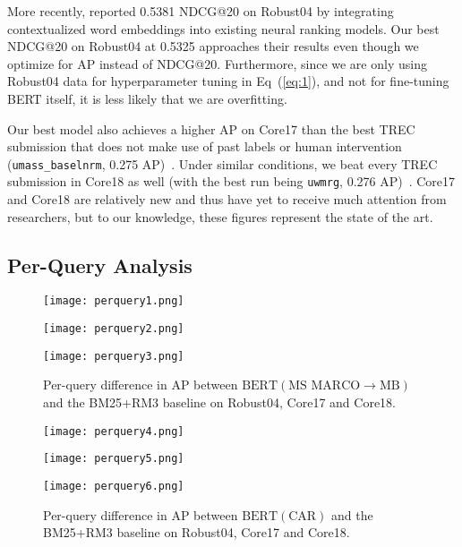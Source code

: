 More recently, \cite{MacAvaney_etal_SIGIR2019} reported 0.5381 NDCG@20 on Robust04 by integrating contextualized word embeddings into existing neural ranking models.
Our best NDCG@20 on \mbox{Robust04} at 0.5325 approaches their results even though we optimize for AP instead of NDCG@20.
Furthermore, since we are only using Robust04 data for hyperparameter tuning in Eq~(\ref{eq:1}), and not for fine-tuning BERT itself, it is less likely that we are overfitting.

Our best model also achieves a higher AP on Core17 than the best TREC submission that does not make use of past labels or human intervention (\texttt{umass\_baselnrm}, 0.275 AP)~\cite{allan2017trec}.
Under similar conditions, we beat every TREC submission in Core18 as well (with the best run being \texttt{uwmrg}, 0.276 AP)~\cite{core2018trec}.
Core17 and Core18 are relatively new and thus have yet to receive much attention from researchers, but to our knowledge, these figures represent the state of the art.

\subsection{Per-Query Analysis}

\begin{figure}[t!]
	\centering
    \begin{minipage}{0.3\textwidth}
        \centering
        \texttt{[image: perquery1.png]}
    \end{minipage}\hfill
    \begin{minipage}{0.3\textwidth}
        \centering
        \texttt{[image: perquery2.png]}
    \end{minipage}\hfill
    \begin{minipage}{0.3\textwidth}
        \centering
        \texttt{[image: perquery3.png]}
    \end{minipage}
\caption{Per-query difference in AP between $ \textrm{BERT}(\textrm{MS MARCO}\rightarrow\textrm{MB}) $ and the BM25+RM3 baseline on Robust04, Core17 and Core18.}
\label{fig:perquery-msmarcomb}
\end{figure}

\begin{figure}[b!]
	\centering
    \begin{minipage}{0.3\textwidth}
        \centering
        \texttt{[image: perquery4.png]} %
    \end{minipage}\hfill
    \begin{minipage}{0.3\textwidth}
        \centering
        \texttt{[image: perquery5.png]} %
    \end{minipage}\hfill
    \begin{minipage}{0.3\textwidth}
        \centering
        \texttt{[image: perquery6.png]} %
    \end{minipage}
\caption{Per-query difference in AP between $ \textrm{BERT}(\textrm{CAR}) $ and the BM25+RM3 baseline on Robust04, Core17 and Core18.}
\label{fig:perquery-car}
\end{figure}

